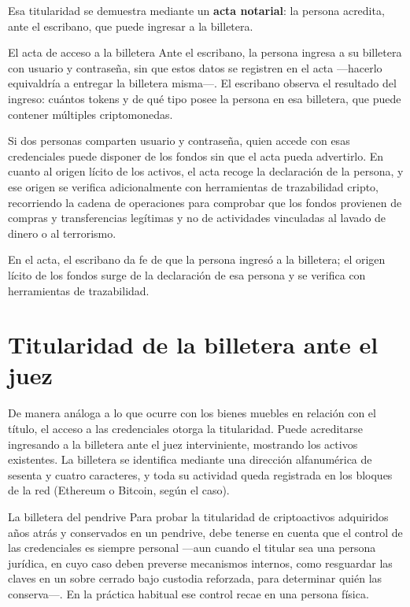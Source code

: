 \documentclass[12pt,oneside]{book}
\begin{document}
Esa titularidad se demuestra mediante un \textbf{acta notarial}: la persona acredita, ante el escribano, que puede ingresar a la billetera.

\begin{example}{El acta de acceso a la billetera}
Ante el escribano, la persona ingresa a su billetera con usuario y contraseña, sin que estos datos se registren en el acta ---hacerlo equivaldría a entregar la billetera misma---. El escribano observa el resultado del ingreso: cuántos tokens y de qué tipo posee la persona en esa billetera, que puede contener múltiples criptomonedas.
\end{example}

Si dos personas comparten usuario y contraseña, quien accede con esas credenciales puede disponer de los fondos sin que el acta pueda advertirlo. En cuanto al origen lícito de los activos, el acta recoge la declaración de la persona, y ese origen se verifica adicionalmente con herramientas de trazabilidad cripto, recorriendo la cadena de operaciones para comprobar que los fondos provienen de compras y transferencias legítimas y no de actividades vinculadas al lavado de dinero o al terrorismo.

\begin{important}
En el acta, el escribano da fe de que la persona ingresó a la billetera; el origen lícito de los fondos surge de la declaración de esa persona y se verifica con herramientas de trazabilidad.
\end{important}

\section{Titularidad de la billetera ante el juez}

De manera análoga a lo que ocurre con los bienes muebles en relación con el título, el acceso a las credenciales otorga la titularidad. Puede acreditarse ingresando a la billetera ante el juez interviniente, mostrando los activos existentes. La billetera se identifica mediante una dirección alfanumérica de sesenta y cuatro caracteres, y toda su actividad queda registrada en los bloques de la red (Ethereum o Bitcoin, según el caso).

\begin{example}{La billetera del pendrive}
Para probar la titularidad de criptoactivos adquiridos años atrás y conservados en un pendrive, debe tenerse en cuenta que el control de las credenciales es siempre personal ---aun cuando el titular sea una persona jurídica, en cuyo caso deben preverse mecanismos internos, como resguardar las claves en un sobre cerrado bajo custodia reforzada, para determinar quién las conserva---. En la práctica habitual ese control recae en una persona física.
\end{example}
\end{document}
